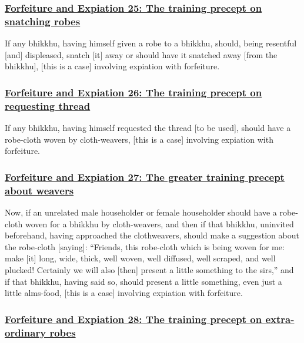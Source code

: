\subsubsection*{\hyperref[np25]{Forfeiture and Expiation 25: The training precept on snatching robes}}
\label{forf-exp25}

If any bhikkhu, having himself given a robe to a bhikkhu, should, being resentful [and] displeased, snatch [it] away or should have it snatched away [from the bhikkhu], [this is a case] involving expiation with forfeiture.



\subsubsection*{\hyperref[np26]{Forfeiture and Expiation 26: The training precept on requesting thread}}
\label{forf-exp26}

If any bhikkhu, having himself requested the thread [to be used], should have a robe-cloth woven by cloth-weavers, [this is a case] involving expiation with forfeiture.



\subsubsection*{\hyperref[np27]{Forfeiture and Expiation 27: The greater training precept about weavers}}
\label{forf-exp27}

Now, if an unrelated male householder or female householder should have a robe-cloth woven for a bhikkhu by cloth-weavers, and then if that bhikkhu, uninvited beforehand, having approached the clothweavers, should make a suggestion about the robe-cloth [saying]: ``Friends, this robe-cloth which is being woven for me: make [it] long, wide, thick, well woven, well diffused, well scraped, and well plucked! Certainly we will also [then] present a little something to the sirs,'' and if that bhikkhu, having said so, should present a little something, even just a little alms-food, [this is a case] involving expiation with forfeiture.



\subsubsection*{\hyperref[np28]{Forfeiture and Expiation 28: The training precept on extra-ordinary robes}}
\label{forf-exp28}

